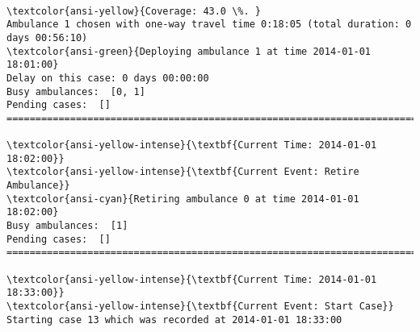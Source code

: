 \documentclass[11pt]{article}
\begin{document}
    \begin{center}
    \end{center}
    { \hspace*{\fill} \\}
    
    \begin{Verbatim}[commandchars=\\\{\}]
\textcolor{ansi-yellow}{Coverage: 43.0 \%. }
Ambulance 1 chosen with one-way travel time 0:18:05 (total duration: 0 days 00:56:10)
\textcolor{ansi-green}{Deploying ambulance 1 at time 2014-01-01 18:01:00}
Delay on this case: 0 days 00:00:00
Busy ambulances:  [0, 1]
Pending cases:  []
========================================================================

\textcolor{ansi-yellow-intense}{\textbf{Current Time: 2014-01-01 18:02:00}}
\textcolor{ansi-yellow-intense}{\textbf{Current Event: Retire Ambulance}}
\textcolor{ansi-cyan}{Retiring ambulance 0 at time 2014-01-01 18:02:00}
Busy ambulances:  [1]
Pending cases:  []
========================================================================

\textcolor{ansi-yellow-intense}{\textbf{Current Time: 2014-01-01 18:33:00}}
\textcolor{ansi-yellow-intense}{\textbf{Current Event: Start Case}}
Starting case 13 which was recorded at 2014-01-01 18:33:00

    \end{Verbatim}

    \begin{center}
    \end{center}
    { \hspace*{\fill} \\}
    
\end{document}
